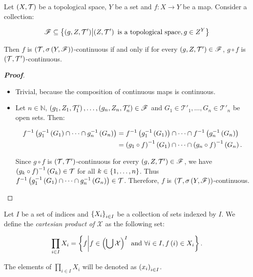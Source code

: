 \begin{proposition}\label{Continuity with respect to the weak topology}
  Let $\left(X,\mathcal{T}\right)$ be a topological space, $Y$ be a set and $f:X\rightarrow Y$ be a map. Consider a collection:
  
  \begin{equation}
    \mathscr{F}\subseteq\left\{\left(g,Z,\mathcal{T}'\right)\middle|\left(Z,\mathcal{T}'\right)\text{ is a topological space}, g\in Z^Y\right\}
  \end{equation}

  Then $f$ is $\left(\mathcal{T},\sigma\left(Y,\mathscr{F}\right)\right)$-continuous if and only if for every $\left(g,Z,\mathcal{T}'\right)\in\mathscr{F}$, $g\circ f$ is $\left(\mathcal{T},\mathcal{T}'\right)$-continuous.
  \begin{proof}[\rm\textbf{Proof}]
    \hfill
    \begin{itemize}
      \item[\boxed{\Rightarrow}] Trivial, because the composition of continuous maps is continuous.
      \item[\boxed{\Leftarrow}] Let $n\in\mathbb{N}$, $\left(g_1,Z_1,\mathcal{T}_1'\right),\dots,\left(g_n,Z_n,\mathcal{T}_n'\right)\in\mathscr{F}$ and $G_1\in\mathcal{T}'_1,\dots, G_n\in\mathcal{T}'_n$ be open sets. Then:
      
      \begin{equation}
        \begin{split}
          f^{-1}\left(g_1^{-1}\left(G_1\right)\cap\dots\cap g_n^{-1}\left(G_n\right)\right) & =f^{-1}\left(g_1^{-1}\left(G_1\right)\right)\cap\dots\cap f^{-1}\left(g_n^{-1}\left(G_n\right)\right)\\
          & =\left(g_1\circ f\right)^{-1}\left(G_1\right)\cap\dots\cap\left(g_n\circ f\right)^{-1}\left(G_n\right).
        \end{split}
      \end{equation}

      Since $g\circ f$ is $\left(\mathcal{T},\mathcal{T}'\right)$-continuous for every $\left(g,Z,\mathcal{T}'\right)\in\mathscr{F}$, we have $\left(g_k\circ f\right)^{-1}\left(G_k\right)\in\mathcal{T}$ for all $k\in\left\{1,\dots,n\right\}$. Thus $f^{-1}\left(g_1^{-1}\left(G_1\right)\cap\dots\cap g_n^{-1}\left(G_n\right)\right)\in\mathcal{T}$. Therefore, $f$ is $\left(\mathcal{T},\sigma\left(Y,\mathscr{F}\right)\right)$-continuous.
    \end{itemize}
  \end{proof}
\end{proposition}

\begin{definition}
  Let $I$ be a set of indices and $\left\{X_i\right\}_{i\in I}$ be a collection of sets indexed by $I$. We define the \textit{cartesian product of $\mathcal{X}$} as the following set:

  \begin{equation}
    \prod_{i\in I}{X_i}=\left\{f\middle|f\in\left(\bigcup{\mathcal{X}}\right)^{I}\text{ and }\forall i\in I,f\left(i\right)\in X_i\right\}.
  \end{equation}
  
  The elements of $\prod_{i\in I}{X_i}$ will be denoted as $\left(x_i\right)_{i\in I}$.
\end{definition}

